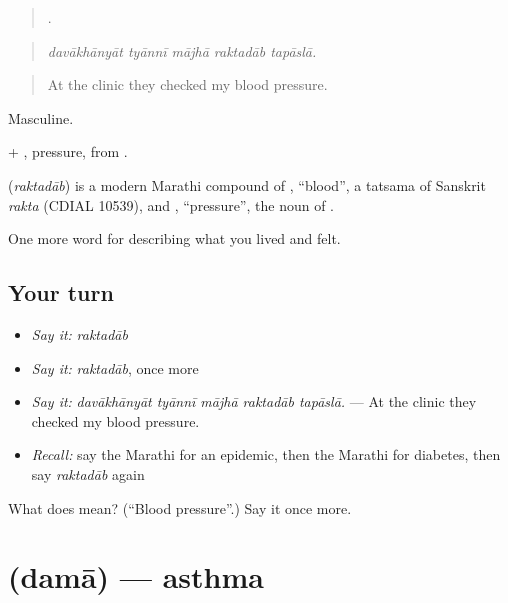 \begin{quote}
    .
\end{quote}

\begin{quote}
\emph{davākhānyāt tyānnī mājhā raktadāb tapāslā.}
\end{quote}

\begin{quote}
At the clinic they checked my blood pressure.
\end{quote}

Masculine.

 + , pressure, from .

\begin{cousinweb}
\textbf{} (\emph{raktadāb}) is a modern Marathi compound of , \textquotedblleft{}blood\textquotedblright{}, a tatsama of Sanskrit \emph{rakta} (CDIAL 10539), and , \textquotedblleft{}pressure\textquotedblright{}, the noun of .
\end{cousinweb}

\begin{grammarlens}[title={What you've built}]
One more word for describing what you lived and felt.
\end{grammarlens}

\subsection*{Your turn}
\begin{itemize}
\raggedright
  \item \emph{Say it:} \emph{raktadāb}
  \item \emph{Say it:} \emph{raktadāb}, once more
  \item \emph{Say it:} \emph{davākhānyāt tyānnī mājhā raktadāb tapāslā.} — At the clinic they checked my blood pressure.
  \item \emph{Recall:} say the Marathi for an epidemic, then the Marathi for diabetes, then say \emph{raktadāb} again
\end{itemize}

\begin{tcolorbox}[breakable,colback=teal!4,colframe=teal!35!black,title={Before you move on}]
What does  mean? (\textquotedblleft{}Blood pressure\textquotedblright{}.) Say it once more.
\end{tcolorbox}
\section[\texorpdfstring{\mr{दमा} (damā)}{दमा (damā)}]{ (damā) — asthma}

